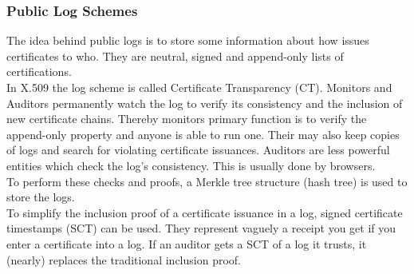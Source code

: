 \subsubsection{Public Log Schemes}
The idea behind public logs is to store some information about how issues certificates to who.
They are neutral, signed and append-only lists of certifications.\\

In X.509 the log scheme is called Certificate Transparency (CT).
Monitors and Auditors permanently watch the log to verify its consistency and the inclusion of new certificate chains.
Thereby monitors primary function is to verify the append-only property and anyone is able to run one.
Their may also keep copies of logs and search for violating certificate issuances.
Auditors are less powerful entities which check the log's consistency.
This is usually done by browsers.\\
To perform these checks and proofs, a Merkle tree structure (hash tree) is used to store the logs.\\
To simplify the inclusion proof of a certificate issuance in a log, signed certificate timestamps (SCT) can be used.
They represent vaguely a receipt you get if you enter a certificate into a log.
If an auditor gets a SCT of a log it trusts, it (nearly) replaces the traditional inclusion proof.
